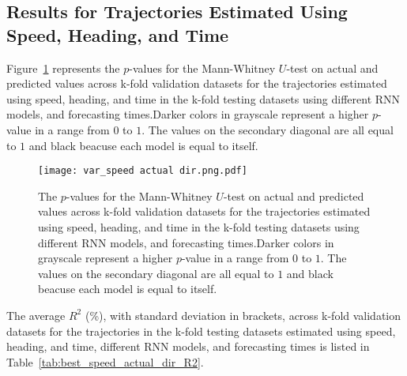 \subsection{Results for Trajectories Estimated Using Speed, Heading, and Time}

Figure~\ref{fig:var_speed actual dir.png} represents the $p$-values for the Mann-Whitney $U$-test on actual and predicted values across k-fold validation datasets for the trajectories estimated using speed, heading, and time in the k-fold testing datasets using different RNN models, and forecasting times.Darker colors in grayscale represent a higher $p$-value in a range from $0$ to $1$. The values on the secondary diagonal are all equal to $1$ and black beacuse each model is equal to itself.

\begin{figure}[!ht]
	\centering
	\texttt{[image: var\_speed actual dir.png.pdf]}
	\caption{The $p$-values for the Mann-Whitney $U$-test on actual and predicted values across k-fold validation datasets for the trajectories estimated using speed, heading, and time in the k-fold testing datasets using different RNN models, and forecasting times.Darker colors in grayscale represent a higher $p$-value in a range from $0$ to $1$. The values on the secondary diagonal are all equal to $1$ and black beacuse each model is equal to itself.}
	\label{fig:var_speed actual dir.png}
\end{figure}

The average $R^{2}$ (\%), with standard deviation in brackets, across k-fold validation datasets for the trajectories in the k-fold testing datasets estimated using speed, heading, and time, different RNN models, and forecasting times is listed in Table~\ref{tab:best_speed_actual_dir_R2}.

